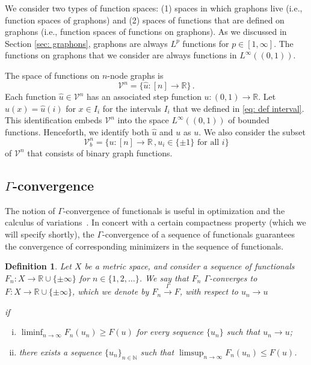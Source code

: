 \documentclass[11pt]{amsart}
\newtheorem{definition}{Definition}[section]
\def\R{\mathbb{R}}
\def\N{\mathbb{N}}
\def\ra{\rightarrow}
\def\gamra{\stackrel{\Gamma}{\longrightarrow}}
\numberwithin{equation}{section}
\begin{document}
{We consider two types of function spaces: (1) spaces in which graphons live (i.e., function spaces of graphons) and (2) spaces of functions that are defined on graphons (i.e., function spaces of functions on graphons). As we discussed in Section \ref{sec: graphons}, graphons are always $L^p$ functions {for $p\in [1,\infty]$}. The functions on graphons that we consider are always {functions in $L^\infty((0,1))$}. 

The space of functions on $n$-node graphs is 
\begin{equation}
	\mathcal{V}^n = \{\hat{u}: [n] \ra \R\} \,.
\end{equation}	
Each function $\hat{u} \in \mathcal{V}^n$ has an associated step function $u: (0,1)\ra \R$. Let $u(x) = \hat{u}(i)$ for $x\in I_i$ for the  intervals $I_i$ that we defined in \eqref{eq: def interval}. 
This identification embeds $\mathcal{V}^n$ into the space $L^\infty((0,1))$ of bounded functions. Henceforth, we identify both $\hat{u}$ and $u$ as $u$. We also consider the subset 
\begin{equation}
	\mathcal{V}^n_b = \{u: [n] \ra \R\,, u_i \in \{\pm 1\} \,\,\text{for all}\,\, i\} 
\end{equation}	
of $\mathcal{V}^n$ that consists of binary graph functions.


\subsection{\texorpdfstring{$\Gamma$-convergence}{Gamma-convergence}}\label{sec: gamma convergence}

The notion of $\Gamma$-convergence of functionals is useful in optimization and the calculus of variations~\cite{braides2006handbook, van2012gamma}. In concert with a certain compactness property {(which we will specify shortly)}, the $\Gamma$-convergence of a sequence of functionals guarantees the convergence of corresponding minimizers {in} the sequence of functionals.  

\begin{definition} \label{def: gamma convergence}
    Let $X$ be a metric space, and consider a sequence of functionals $F_n: X \ra \R \cup \{\pm \infty\}$ for $n\in \{1,2,\ldots\}$. We say that $F_n$ \emph{$\Gamma$-converges} to $F: X \ra \R \cup \{\pm \infty\}$, which we denote by $F_n \gamra F$, with respect to $u_n \ra u$ {if 
    \begin{enumerate}[(i)]
        \item{{$\liminf_{n\ra\infty} F_n(u_n) \geq F(u)$ for every sequence $\{u_n\}$ such that $u_n \ra u$;}}
        \item{there exists a sequence $\{u_n\}_{n\in \N}$ such that $\limsup_{n\ra \infty} F_n(u_n) \leq F(u)$.} 
    \end{enumerate}}
\end{definition}

}
\end{document}
